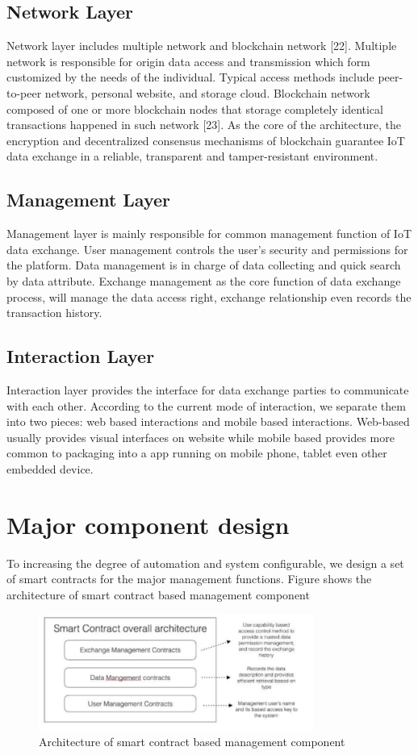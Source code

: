 \section{Network Layer} 
Network layer includes multiple network and blockchain
network [22]. Multiple network is responsible for origin data
access and transmission which form customized by the needs
of the individual. Typical access methods include
peer-to-peer network, personal website, and storage cloud.
Blockchain network composed of one or more blockchain
nodes that storage completely identical transactions
happened in such network [23]. As the core of the
architecture, the encryption and decentralized consensus
mechanisms of blockchain guarantee IoT data exchange in a
reliable, transparent and tamper-resistant environment.
\section{Management Layer}
Management layer is mainly responsible for common
management function of IoT data exchange. User
management controls the user’s security and permissions for
the platform. Data management is in charge of data
collecting and quick search by data attribute. Exchange
management as the core function of data exchange process,
will manage the data access right, exchange relationship
even records the transaction history.
\section{Interaction Layer}
Interaction layer provides the interface for data exchange
parties to communicate with each other. According to the
current mode of interaction, we separate them into two
pieces: web based interactions and mobile based interactions.
Web-based usually provides visual interfaces on website
while mobile based provides more common to packaging
into a app running on mobile phone, tablet even other
embedded device.
\chapter{ Major component design}
To increasing the degree of automation and system
configurable, we design a set of smart contracts for the major
management functions. Figure shows the architecture of smart
contract based management component
\begin{figure}[h]
	\centering
	\includegraphics[width=9cm]{./smatcontract_management}
	\caption{Architecture of smart contract based management component}
\end{figure}
